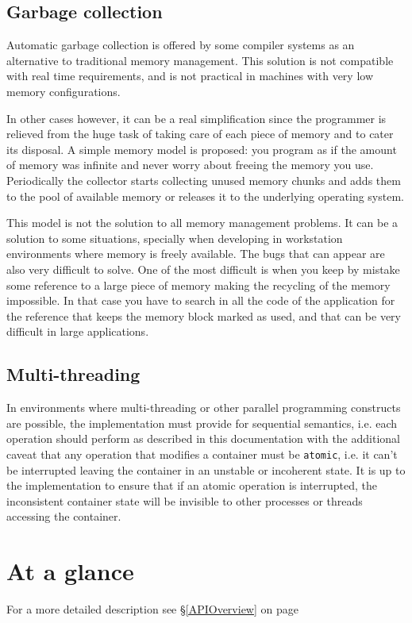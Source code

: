 \documentclass[12pt,a4paper]{memoir} %
\newcommand{\See}[1]{%
see \S\ref{#1} on page~\pageref{#1}
}
\newlength{\yellownotewidth}
\newlength{\yellownoteheight}
\newcommand{\resizeableyellownote}[3]{
\setlength{\yellownotewidth}{#1cm}
\setlength{\yellownoteheight}{#2cm}
\marginpar{
    \vspace{-0.2\yellownoteheight}
        \begin{center}
        \begin{tikzpicture}
            \draw[white,fill=gray!25,opacity=0.75,shift={(-0.125,-0.125)}] 
                (0.0,0.0) rectangle (\yellownotewidth,\yellownoteheight);
            \draw[fill=yellow!35] (0,0.0) rectangle (\yellownotewidth,\yellownoteheight);
            \draw[opacity=0.95,fill=gray!50] (0.5\yellownotewidth,0.9\yellownoteheight) -- 
                (0.7\yellownotewidth,0.45+#2) -- (0.8\yellownotewidth,0.4+#2) -- cycle;
            \node[blue,below] at (0.5\yellownotewidth,0.8\yellownoteheight) {
                \begin{minipage}{\yellownotewidth}
                    \scriptsize#3
                \end{minipage}
            };
        \end{tikzpicture}
        \end{center}
        \vspace{0.5\yellownoteheight}
    }
}
\begin{document}
\subsection{Garbage collection}
Automatic garbage collection is offered by some compiler systems as an alternative to traditional memory management. This solution is
not compatible with real time requirements, and is not practical in machines with very low memory configurations.

In other cases however, it can be a real simplification since the programmer is relieved from the huge task of taking care of each
piece of memory and to cater its disposal. A simple memory model is proposed: you program as if the amount of memory was infinite
and never worry about freeing the memory you use. Periodically the collector starts collecting unused memory chunks and adds them
to the pool of available memory or releases it to the underlying operating system.

This model is not the solution to all memory management problems. It can be a solution to some situations, specially when developing
in workstation environments where memory is freely available. The bugs that can appear are also very difficult to solve. One of the
most difficult is when you keep by mistake some reference to a large piece of memory making the recycling of the memory impossible.
In that case you have to search in all the code of the application for the reference that keeps the memory block marked as used, and that can
be very difficult in large applications.
\subsection{Multi-threading}
In environments where multi-threading or other parallel programming constructs are possible, the implementation must provide for sequential
semantics, i.e. each operation should perform as described in this documentation with the additional caveat that any operation that modifies
a container must be \texttt{atomic}, i.e. it can't be interrupted leaving the container in an unstable or incoherent state. It is up to the
implementation to ensure that if an atomic operation is interrupted, the inconsistent container state will be invisible to other processes
or threads accessing the container.
\section{At a glance}
For a more detailed description \See{APIOverview}
\end{document}
